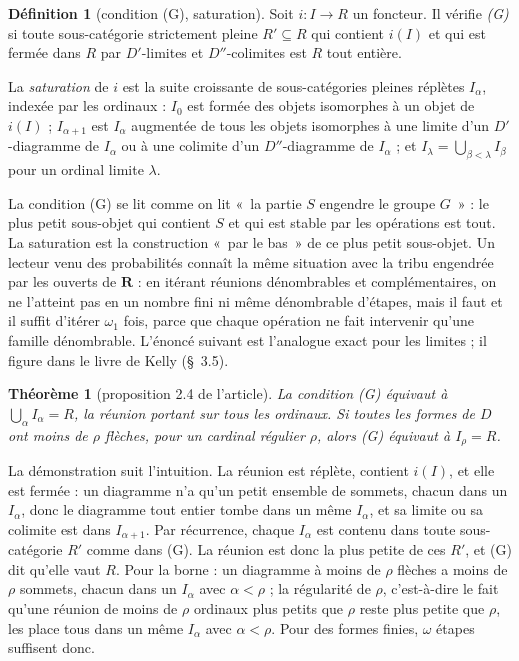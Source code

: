 \documentclass[11pt,a4paper]{amsart}
\theoremstyle{definition}
\newtheorem{definition}{Définition}
\theoremstyle{plain}
\newtheorem{theoreme}{Théorème}
\theoremstyle{remark}
\begin{document}
\begin{definition}[condition (G), saturation]
Soit $i\colon I\to R$ un foncteur. Il vérifie \emph{(G)} si toute sous-catégorie strictement pleine $R'\subseteq R$ qui contient $i(I)$ et qui est fermée dans $R$ par $D'$-limites et $D''$-colimites est $R$ tout entière.

La \emph{saturation} de $i$ est la suite croissante de sous-catégories pleines réplètes $I_\alpha$, indexée par les ordinaux : $I_0$ est formée des objets isomorphes à un objet de $i(I)$ ; $I_{\alpha+1}$ est $I_\alpha$ augmentée de tous les objets isomorphes à une limite d'un $D'$-diagramme de $I_\alpha$ ou à une colimite d'un $D''$-diagramme de $I_\alpha$ ; et $I_\lambda=\bigcup_{\beta<\lambda}I_\beta$ pour un ordinal limite $\lambda$.
\end{definition}

La condition (G) se lit comme on lit «~la partie $S$ engendre le groupe $G$~» : le plus petit sous-objet qui contient $S$ et qui est stable par les opérations est tout. La saturation est la construction «~par le bas~» de ce plus petit sous-objet. Un lecteur venu des probabilités connaît la même situation avec la tribu engendrée par les ouverts de $\mathbf R$ : en itérant réunions dénombrables et complémentaires, on ne l'atteint pas en un nombre fini ni même dénombrable d'étapes, mais il faut et il suffit d'itérer $\omega_1$ fois, parce que chaque opération ne fait intervenir qu'une famille dénombrable. L'énoncé suivant est l'analogue exact pour les limites ; il figure dans le livre de Kelly (§~3.5).

\begin{theoreme}[proposition 2.4 de l'article]
La condition (G) équivaut à $\bigcup_\alpha I_\alpha=R$, la réunion portant sur tous les ordinaux. Si toutes les formes de $D$ ont moins de $\rho$ flèches, pour un cardinal régulier $\rho$, alors (G) équivaut à $I_\rho=R$.
\end{theoreme}

La démonstration suit l'intuition. La réunion est réplète, contient $i(I)$, et elle est fermée : un diagramme n'a qu'un petit ensemble de sommets, chacun dans un $I_\alpha$, donc le diagramme tout entier tombe dans un même $I_\alpha$, et sa limite ou sa colimite est dans $I_{\alpha+1}$. Par récurrence, chaque $I_\alpha$ est contenu dans toute sous-catégorie $R'$ comme dans (G). La réunion est donc la plus petite de ces $R'$, et (G) dit qu'elle vaut $R$. Pour la borne : un diagramme à moins de $\rho$ flèches a moins de $\rho$ sommets, chacun dans un $I_\alpha$ avec $\alpha<\rho$ ; la régularité de $\rho$, c'est-à-dire le fait qu'une réunion de moins de $\rho$ ordinaux plus petits que $\rho$ reste plus petite que $\rho$, les place tous dans un même $I_\alpha$ avec $\alpha<\rho$. Pour des formes finies, $\omega$ étapes suffisent donc.
\end{document}
